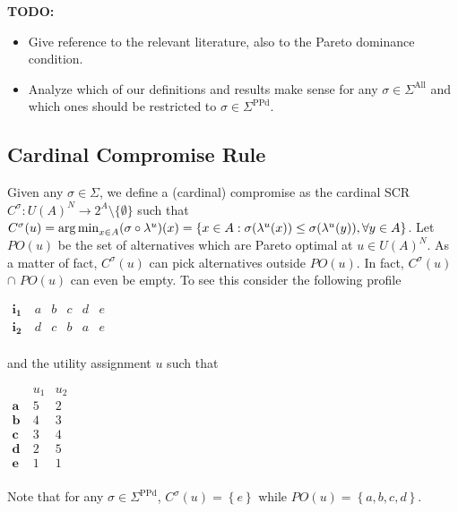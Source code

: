 \documentclass[version=3.21, pagesize, notitlepage, twoside=off, bibliography=totoc, DIV=calc, fontsize=12pt, a4paper]{scrartcl}
\newcommand{\paretopt}{\mathit{PO}}
\newcommand{\SPPd}{\Sigma^\text{PPd}}
\newcommand{\SAll}{\Sigma^\text{All}}
\begin{document}
\textbf{TODO: }
\begin{itemize}
	\item Give reference to the relevant literature, also to the Pareto dominance condition.
	\item Analyze which of our definitions and results make sense for any $\sigma \in \SAll$ and which ones should be restricted to $\sigma \in \SPPd$.
\end{itemize}

\subsection{Cardinal Compromise Rule}
Given any $\sigma \in \Sigma$, we define a (cardinal) compromise as the cardinal SCR $C^{\sigma }:U(A)^{N}\rightarrow 2^{A} \setminus \{\emptyset \}$ such that $C^{\sigma }(u) = \operatorname*{arg\,min}_{x \in A} (\sigma \circ \lambda^u)(x) = \left\{ x\in A:\sigma (\lambda ^{u}(x))\leq \sigma (\lambda ^{u}(y)), \forall y\in A\right\} $. Let $\paretopt(u)$ be the set of alternatives which are Pareto optimal at $u\in U(A)^{N}$. As a matter of fact, $C^{\sigma }(u)$ can pick alternatives outside $\paretopt(u)$. In fact, $C^{\sigma }(u)$ $\cap $ $\paretopt(u)$ can even be empty. To see this consider the following profile
\begin{center}
	$
	\begin{array}{cccccc}
	\mathbf{i_1} \ & a & b & c & d & e \\
	\mathbf{i_2} \ & d & c & b & a & e \\
	\end{array}
	$
\end{center}
and the utility assignment $u$ such that
\begin{center}
	$
	\begin{array}{ccc}
	& u_1 & u_2 \\
	\mathbf{a} \ & 5 & 2 \\
	\mathbf{b} \ & 4 & 3 \\
	\mathbf{c} \ & 3 & 4 \\
	\mathbf{d} \ & 2 & 5 \\
	\mathbf{e} \ & 1 & 1 \\
	\end{array}
	$
\end{center}
Note that for any $\sigma \in \SPPd $, $C^{\sigma }(u)=\left\{ e\right\} $ while $\paretopt(u)=\left\{ a, b, c, d\right\} $. 
\end{document}
